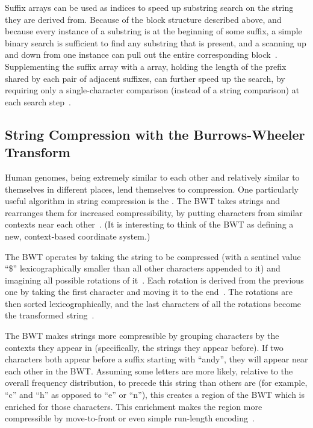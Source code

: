 Suffix arrays can be used as indices to speed up substring search on the string they are derived from. Because of the block structure described above, and because every instance of a substring is at the beginning of some suffix, a simple binary search is sufficient to find any substring that is present, and a scanning up and down from one instance can pull out the entire corresponding block~\cite{manber1993suffix}. Supplementing the suffix array with a  array, holding the length of the prefix shared by each pair of adjacent suffixes, can further speed up the search, by requiring only a single-character comparison (instead of a string comparison) at each search step~\cite{manber1993suffix}.

\subsection{String Compression with the Burrows-Wheeler Transform}
\label{subsec:bwt}

Human genomes, being extremely similar to each other and relatively similar to themselves in different places, lend themselves to compression. One particularly useful algorithm in string compression is the . The BWT takes strings and rearranges them for increased compressibility, by putting characters from similar contexts near each other~\cite{burrows1994block}. (It is interesting to think of the BWT as defining a new, context-based coordinate system.)

The BWT operates by taking the string to be compressed (with a sentinel value ``\$'' lexicographically smaller than all other characters appended to it) and imagining all possible rotations of it~\cite{burrows1994block, ferragina2000opportunistic}. Each rotation is derived from the previous one by taking the first character and moving it to the end~\cite{burrows1994block}. The rotations are then sorted lexicographically, and the last characters of all the rotations become the transformed string~\cite{burrows1994block}.

The BWT makes strings more compressible by grouping characters by the contexts they appear in (specifically, the strings they appear before). If two characters both appear before a suffix starting with ``andy'', they will appear near each other in the BWT. Assuming some letters are more likely, relative to the overall frequency distribution, to precede this string than others are (for example, ``c'' and ``h'' as opposed to ``e'' or ``n''), this creates a region of the BWT which is enriched for those characters. This enrichment makes the region more compressible by move-to-front or even simple run-length encoding~\cite{burrows1994block}.


